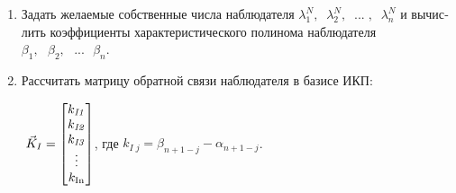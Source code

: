 \documentclass[a4paper]{article}
\newcommand\liststyleWWviiiNumxxix{%
\renewcommand\theenumi{\arabic{enumi}}
\renewcommand\theenumii{\arabic{enumii}}
\renewcommand\theenumiii{\arabic{enumiii}}
\renewcommand\theenumiv{\arabic{enumiv}}
\renewcommand\labelenumi{\theenumi.}
\renewcommand\labelenumii{\theenumii.}
\renewcommand\labelenumiii{\theenumiii.}
\renewcommand\labelenumiv{\theenumiv.}
}
\newcommand\normalsubformula[1]{\text{\mathversion{normal}$#1$}}
\begin{document}
\liststyleWWviiiNumxxix
\begin{enumerate}
\item {\begin{russian}\sffamily
Задать желаемые собственные числа наблюдателя  $λ_1^N,\;\;λ_2^N,\;\;...\;,\;\;λ_n^N$ и вы­числить коэффициенты
характеристического полинома наблюдателя  $β_1,\text{  }β_2,\text{  }...\text{  }β_n$.
\end{russian}}
\item {\begin{russian}\sffamily
Рассчитать матрицу обратной связи наблюдателя в базисе ИКП:
\end{russian}}
\end{enumerate}
{\begin{russian}\sffamily
\ \ \ \  $\vec K_I=\left[\begin{matrix}k_{\mathit{I1}}\\k_{\mathit{I2}}\\k_{\mathit{I3}}\\\vdots
\\k_{\normalsubformula{\text{In}}}\end{matrix}\right]$, где  $k_{I\;j}=β_{n+1-j}-α_{n+1-j}$.
\end{russian}}
\end{document}

